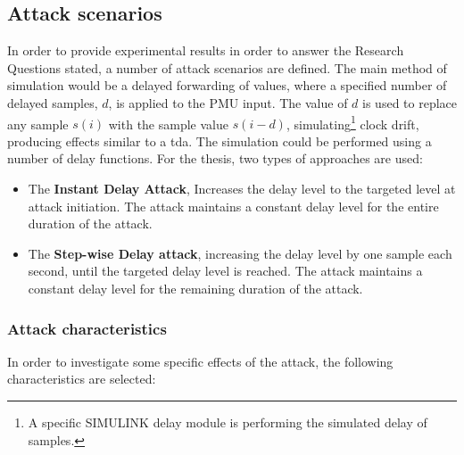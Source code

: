



\subsection{Attack scenarios}
In order to provide experimental results in order to answer the Research Questions stated, a number of attack scenarios are defined.
The main method of simulation would be a delayed forwarding of values, where a specified number of delayed samples, $d$, is applied to the PMU input. The value of $d$ is used to replace any sample $s(i)$ with the sample value $s(i-d)$, simulating\footnote{A specific SIMULINK delay module is performing the simulated delay of samples.} clock drift, producing effects similar to a \acrlong{tda}.
The simulation could be performed using a number of delay functions. For the thesis, two types of approaches are used:
\begin{itemize}
    \item The \textbf{Instant Delay Attack}, Increases the delay level to the targeted level at attack initiation. The attack maintains a constant delay level for the entire duration of the attack. 
    \item The \textbf{Step-wise Delay attack}, increasing the delay level by one sample each second, until the targeted delay level is reached. The attack maintains a constant delay level for the remaining duration of the attack.
\end{itemize}


\subsubsection{Attack characteristics}
In order to investigate some specific effects of the attack, the following characteristics are selected:

